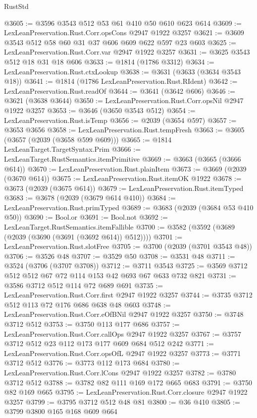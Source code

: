 \begin{lexlean}{RustStd}
\begin{coremodule}
@3605 := @3596 @3543 @512 @53 @61 @410 @50 @610 @623 @614
@3609 := LexLeanPreservation.Rust.Corr.opsCons @2947 @1922 @3257
@3621 := @3609 @3543 @512 @58 @60 @31 @37 @606 @609 @622 @597 @23 @603
@3625 := LexLeanPreservation.Rust.Corr.var @2947 @1922 @3257
@3631 := @3625 @3543 @512 @18 @31 @18 @606
@3633 := @1814 (@1786 @3312)
@3634 := LexLeanPreservation.Rust.ctxLookup
@3638 := @3631 (@3633 (@3634 @3543 @18))
@3641 := @1814 (@1786 LexLeanPreservation.Rust.RIdent)
@3642 := LexLeanPreservation.Rust.readOf
@3644 := @3641 (@3642 @606)
@3646 := @3621 (@3638 @3644)
@3650 := LexLeanPreservation.Rust.Corr.opsNil @2947 @1922 @3257
@3653 := @3646 (@3650 @3543 @512)
@3654 := LexLeanPreservation.Rust.isTemp
@3656 := @2039 (@3654 @597)
@3657 := @3653 @3656
@3658 := LexLeanPreservation.Rust.tempFresh
@3663 := @3605 (@3657 (@2039 (@3658 @599 @609)))
@3665 := @1814 LexLeanTarget.TargetSyntax.Prim
@3666 := LexLeanTarget.RustSemantics.itemPrimitive
@3669 := @3663 (@3665 (@3666 @614))
@3670 := LexLeanPreservation.Rust.plainItem
@3673 := @3669 (@2039 (@3670 @614))
@3675 := LexLeanPreservation.Rust.itemOK @1922
@3678 := @3673 (@2039 (@3675 @614))
@3679 := LexLeanPreservation.Rust.itemTyped
@3683 := @3678 (@2039 (@3679 @614 @410))
@3684 := LexLeanPreservation.Rust.primTyped
@3689 := @3683 (@2039 (@3684 @53 @410 @50))
@3690 := Bool.or
@3691 := Bool.not
@3692 := LexLeanTarget.RustSemantics.itemFallible
@3700 := @3582 (@3592 (@3689 (@2039 (@3690 (@3691 (@3692 @614)) @512))))
@3701 := LexLeanPreservation.Rust.slotFree
@3705 := @3700 (@2039 (@3701 @3543 @48))
@3706 := @3526 @48
@3707 := @3529 @50
@3708 := @3531 @48
@3711 := @3524 (@3706 (@3707 @3708))
@3712 := @3711 @3543
@3725 := @3569 @3712 @512 @512 @67 @72 @114 @153 @42 @693 @67 @633 @732 @821
@3731 := @3586 @3712 @512 @114 @72 @689 @691
@3735 := LexLeanPreservation.Rust.Corr.first @2947 @1922 @3257
@3744 := @3735 @3712 @512 @113 @72 @176 @686 @638 @48 @603
@3748 := LexLeanPreservation.Rust.Corr.eOfBNil @2947 @1922 @3257
@3750 := @3748 @3712 @512
@3753 := @3750 @113 @177 @686
@3757 := LexLeanPreservation.Rust.Corr.callOps @2947 @1922 @3257
@3767 := @3757 @3712 @512 @23 @112 @173 @177 @609 @684 @512 @242
@3771 := LexLeanPreservation.Rust.Corr.opsOfL @2947 @1922 @3257
@3773 := @3771 @3712 @512
@3776 := @3773 @112 @173 @684
@3780 := LexLeanPreservation.Rust.Corr.lCons @2947 @1922 @3257
@3782 := @3780 @3712 @512
@3788 := @3782 @82 @111 @169 @172 @665 @683
@3791 := @3750 @82 @169 @665
@3795 := LexLeanPreservation.Rust.Corr.closure @2947 @1922 @3257
@3799 := @3795 @3712 @512 @48 @81
@3800 := @36 @410
@3805 := @3799 @3800 @165 @168 @609 @664

\end{coremodule}
\end{lexlean}
